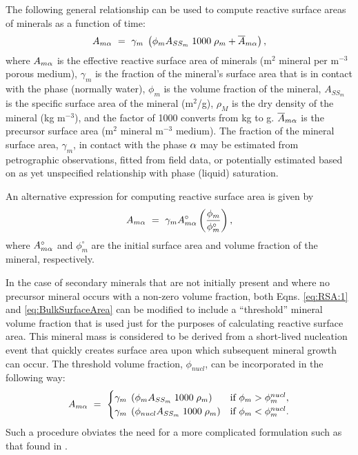The following general relationship can be used to compute reactive
surface areas of minerals as a function of time:
%
\begin{equation}
  A_{m{\alpha}} \ =\  \gamma_{m} \; \left( \phi_{m} A _{SS_m} \; 1000 \;
    \rho_{m} + \overline{A}_{m{\alpha}} \right),
 \label{eq:RSA:1}
\end{equation}
%
where $A_{m{\alpha}}$ is the effective reactive surface area of minerals
(m$^2$ mineral per m$^{-3}$ porous medium), $\gamma_{m}$ is the
fraction of the mineral's surface area that is in contact with the
phase (normally water), $\phi_m$ is the volume fraction of the
mineral, $A _{SS_m}$ is the specific surface area of the mineral
(m$^2$/g), $\rho_M$ is the dry density of the mineral (kg m$^{-3}$),
and the factor of 1000 converts from kg to g.  $\overline{A}_{m{\alpha}}$ is
the precursor surface area (m$^2$ mineral m$^{-3}$ medium).  The
fraction of the mineral surface area, $\gamma_{m}$, in contact with
the phase ${\alpha}$ may be estimated from petrographic observations, fitted
from field data, or potentially estimated based on as yet unspecified
relationship with phase (liquid) saturation.

An alternative expression for computing reactive surface area is given
by \citet{steefel-1994}
%
\begin{equation}  
  A_{m{\alpha}} \ =\  \gamma_{m}   A_{m{\alpha}}^{\circ}   
   \left(\frac{\phi_m}{\phi_{m}^{\circ} } \right),
 \label{eq:BulkSurfaceArea}
\end{equation} 
%
where $A_{m{\alpha}}^{\circ}$ and $\phi_{m}^{\circ}$ are the initial surface
area and volume fraction of the mineral, respectively.

In the case of secondary minerals that are not initially present and
where no precursor mineral occurs with a non-zero volume fraction,
both Eqns. \eqref{eq:RSA:1} and \eqref{eq:BulkSurfaceArea} can be modified
to include a ``threshold'' mineral volume fraction that is used just
for the purposes of calculating reactive surface area.  This mineral
mass is considered to be derived from a short-lived nucleation event
that quickly creates surface area upon which subsequent mineral growth
can occur.  The threshold volume fraction, $\phi_{nucl}$, can be
incorporated in the following way:
%
\begin{eqnarray}
  A_{m{\alpha}} \ =\ 
 \begin{cases}
   \gamma_{m} \; \left( \phi_{m} A _{SS_m} \; 1000 \; \rho_{m} \right)    & 
   \text{if $\phi_{m}  > \phi_{m}^{nucl}$},\\
   \gamma_{m} \; \left( \phi_{nucl} A _{SS_m} \; 1000 \; \rho_{m} \right)    & 
   \text{if $\phi_{m}  < \phi_{m}^{nucl}$}.\\
 \end{cases}
\end{eqnarray}
%
Such a procedure obviates the need for a more complicated formulation
such as that found in \citet{steefel1990new}.

